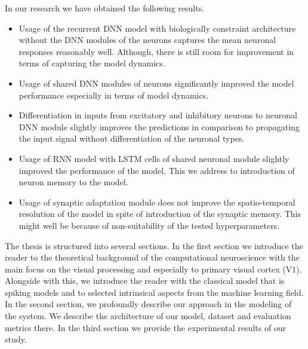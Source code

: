 In our research we have obtained the following results. 
\begin{itemize}
    \item Usage of the recurrent DNN model with biologically constraint 
    architecture without the DNN modules of the neurons captures the 
    mean neuronal responses reasonably well. Although, there is still
    room for improvement in terms of capturing the model dynamics.
    \item Usage of shared DNN modules of neurons significantly improved the
    model performance especially in terms of model dynamics.
    \item Differentiation in inputs from excitatory and inhibitory
    neurons to neuronal DNN module slightly improves the predictions in
    comparison to propagating the input signal without differentiation
    of the neuronal types.
    \item Usage of RNN model with LSTM cells of shared neuronal module
    slightly improved the performance of the model. This we address to
    introduction of neuron memory to the model.
    \item Usage of synaptic adaptation module does not improve the
    spatio-temporal resolution of the model in spite of introduction of 
    the synaptic memory. This might well be because of non-suitability of
    the tested hyperparameters.
\end{itemize}

The thesis is structured into several sections. In the first section
we introduce the reader to the theoretical background of the computational
neuroscience with the main focus on the visual processing and especially
to primary visual cortex (V1). Alongside with this, we introduce the reader
with the classical model that is spiking models and to selected intrinsical
aspects from the machine learning field. In the second section, we profoundly
describe our approach in the modeling of the system. We describe the architecture
of our model, dataset and evaluation metrics there. In the third section
we provide the experimental results of our study.


